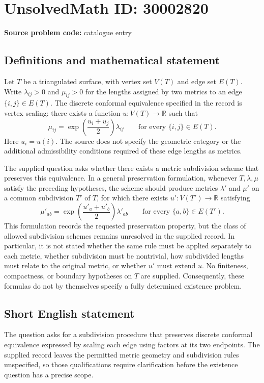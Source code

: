 \documentclass[11pt]{article}
\newcommand{\R}{\mathbb{R}}
\begin{document}
\section*{UnsolvedMath ID: 30002820}
\textbf{Source problem code:} catalogue entry
\subsection{Definitions and mathematical statement}
Let \(T\) be a triangulated surface, with vertex set \(V(T)\) and edge set \(E(T)\). Write \(\lambda_{ij}>0\) and \(\mu_{ij}>0\) for the lengths assigned by two metrics to an edge \(\{i,j\}\in E(T)\). The discrete conformal equivalence specified in the record is vertex scaling: there exists a function \(u:V(T)\to\R\) such that
\[
\mu_{ij}=\exp\!\left(\frac{u_i+u_j}{2}\right)\lambda_{ij}
\qquad\text{for every }\{i,j\}\in E(T).
\]
Here \(u_i=u(i)\). The source does not specify the geometric category or the additional admissibility conditions required of these edge lengths as metrics.

The supplied question asks whether there exists a metric subdivision scheme that preserves this equivalence. In a general preservation formulation, whenever \(T,\lambda,\mu\) satisfy the preceding hypotheses, the scheme should produce metrics \(\lambda'\) and \(\mu'\) on a common subdivision \(T'\) of \(T\), for which there exists \(u':V(T')\to\R\) satisfying
\[
\mu'_{ab}=\exp\!\left(\frac{u'_a+u'_b}{2}\right)\lambda'_{ab}
\qquad\text{for every }\{a,b\}\in E(T').
\]
This formulation records the requested preservation property, but the class of allowed subdivision schemes remains unresolved in the supplied record. In particular, it is not stated whether the same rule must be applied separately to each metric, whether subdivision must be nontrivial, how subdivided lengths must relate to the original metric, or whether \(u'\) must extend \(u\). No finiteness, compactness, or boundary hypotheses on \(T\) are supplied. Consequently, these formulas do not by themselves specify a fully determined existence problem.
\subsection{Short English statement}
The question asks for a subdivision procedure that preserves discrete conformal equivalence expressed by scaling each edge using factors at its two endpoints. The supplied record leaves the permitted metric geometry and subdivision rules unspecified, so those qualifications require clarification before the existence question has a precise scope.
\end{document}

